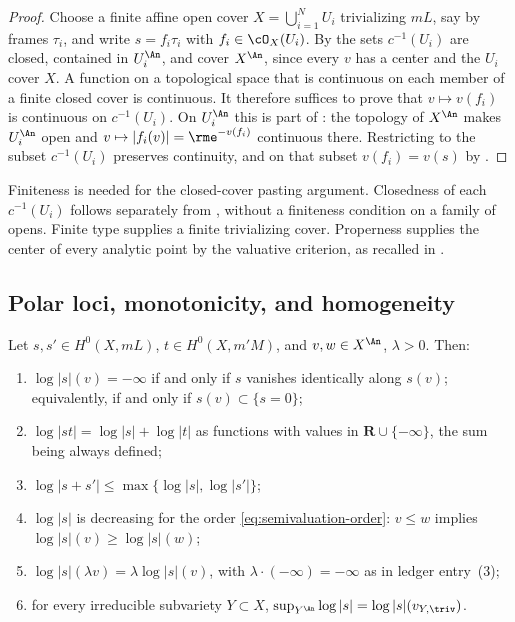 \begin{proof}
Choose a finite affine open cover $X=\bigcup_{i=1}^NU_i$ trivializing
$mL$, say by frames $\tau_i$, and write $s=f_i\tau_i$ with
$f_i\in\cO_X(U_i)$.  By  the sets
$c^{-1}(U_i)$ are closed, contained in $U_i^{\An}$, and cover
$X^{\An}$, since every $v$ has a center and the $U_i$ cover $X$.  A
function on a topological space that is continuous on each member of a
finite closed cover is continuous.  It therefore suffices to prove that
$v\mapsto v(f_i)$ is continuous on $c^{-1}(U_i)$.  On $U_i^{\An}$
this is part of : the topology of
$X^{\An}$ makes $U_i^{\An}$ open and $v\mapsto|f_i(v)|=\rme^{-v(f_i)}$
continuous there.  Restricting to the subset $c^{-1}(U_i)$ preserves
continuity, and on that subset $v(f_i)=v(s)$ by
.
\end{proof}

\begin{remark}
\label{rem:ch34-finite-cover}
Finiteness is needed for the closed-cover pasting argument.
Closedness of each $c^{-1}(U_i)$ follows separately from
, without a finiteness condition
on a family of opens.  Finite type supplies a finite trivializing cover.
Properness supplies the center of every analytic point by the valuative
criterion, as recalled in .
\end{remark}

\subsection{Polar loci, monotonicity, and homogeneity}

\begin{lemma}
\label{lem:ch34-log-s-properties}
Let $s,s'\in H^0(X,mL)$, $t\in H^0(X,m'M)$, and $v,w\in X^{\An}$,
$\lambda>0$.  Then:
\begin{enumerate}
\item\label{itm:ch34-logs:polar}
  $\log|s|(v)=-\infty$ if and only if $s$ vanishes identically along
  $s(v)$; equivalently, if and only if $s(v)\subset\{s=0\}$;
\item\label{itm:ch34-logs:product}
  $\log|st|=\log|s|+\log|t|$ as functions with values in
  $\mathbf R\cup\{-\infty\}$, the sum being always defined;
\item\label{itm:ch34-logs:sum}
  $\log|s+s'|\le\max\{\log|s|,\log|s'|\}$;
\item\label{itm:ch34-logs:decreasing}
  $\log|s|$ is decreasing for the order \eqref{eq:semivaluation-order}:
  $v\le w$ implies $\log|s|(v)\ge\log|s|(w)$;
\item\label{itm:ch34-logs:homogeneous}
  $\log|s|(\lambda v)=\lambda\log|s|(v)$, with
  $\lambda\cdot(-\infty)=-\infty$ as in ledger entry~(3);
\item\label{itm:ch34-logs:max}
  for every irreducible subvariety $Y\subset X$,
  $\sup_{Y^{\An}}\log|s|=\log|s|(v_{Y,\triv})$.
\end{enumerate}
\par
\end{lemma}

